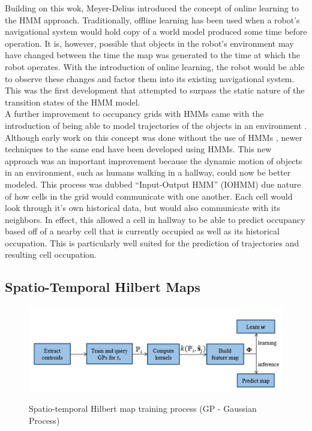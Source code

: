   Building on this wok, Meyer-Delius \cite{Meyer-Delius2012} introduced the concept of online
  learning to the HMM approach. Traditionally, offline learning has been used when
  a robot's navigational system would hold copy of a world model produced some
  time before operation. It is, however, possible that objects in the robot's
  environment may have changed between the time the map was generated to the
  time at which the robot operates. With the introduction of online learning, the
  robot would be able to observe these changes and factor them into its existing
  navigational system. This was the first development that attempted to surpass the static
  nature of the transition states of the HMM model. \\

  A further improvement to occupancy grids with HMMs came with the introduction of
  being able to model trajectories of the objects in an environment
  \cite{Wang2015}. Although early work on this concept was done without the use of HMMs
  \cite{Kucner2013}, newer techniques to the same end have been developed using HMMs.
  This new approach was an important improvement because the
  dynamic motion of objects in an environment, such as humans walking in a
  hallway, could now be better modeled. This process was dubbed ``Input-Output
  HMM'' (IOHMM) due nature of how cells in the grid would communicate with one
  another. Each cell would look through it's own historical data, but would
  also communicate with its neighbors. In effect, this allowed
  a cell in hallway to be able to predict occupancy based off of a nearby cell
  that is currently occupied as well as its historical occupation. This is particularly
  well suited for the prediction of trajectories and resulting cell occupation.

  \subsection{ Spatio-Temporal Hilbert Maps }

  \begin{figure}[!htb]
    \centering
    \includegraphics[width=\linewidth]{images/STHM_diag.png}
    \caption{Spatio-temporal Hilbert map training process (GP - Gaussian Process)}
    \cite{Senanayake2016}
    \label{figure:STHM}
  \end{figure}

